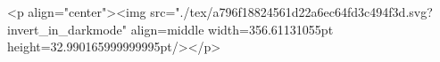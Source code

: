 <p align="center"><img src="./tex/a796f18824561d22a6ec64fd3c494f3d.svg?invert_in_darkmode" align=middle width=356.61131055pt height=32.990165999999995pt/></p>